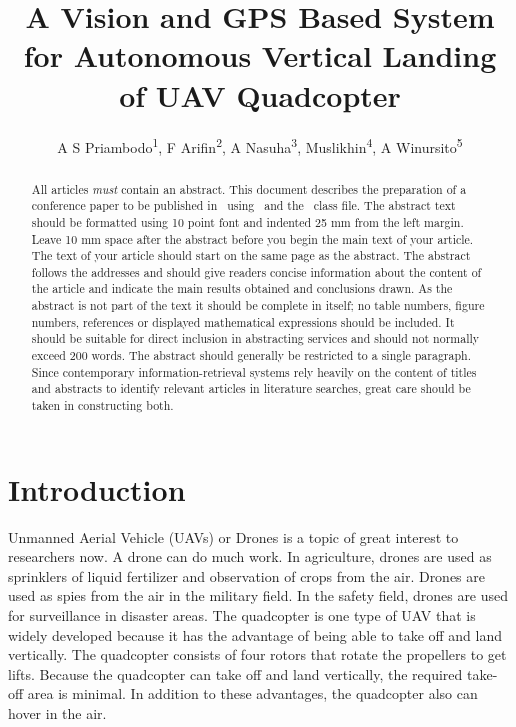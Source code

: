 \documentclass[a4paper]{jpconf}
\begin{document}
\title{A Vision and GPS Based System for Autonomous Vertical Landing of UAV Quadcopter}

\author{A S Priambodo\textsuperscript{1}, F Arifin\textsuperscript{2}, A Nasuha\textsuperscript{3}, Muslikhin\textsuperscript{4}, A Winursito\textsuperscript{5}}

\address{\textsuperscript{1,2,3,4,5}Department of Electronics and Informatics Engineering of Education, Engineering Faculty, Universitas Negeri Yogyakarta, Indonesia}


\begin{abstract}
    All articles {\it must} contain an abstract. This document describes the  preparation of a conference paper to be published in \jpcs\ using \LaTeXe\ and the \cls\ class file. The abstract text should be formatted using 10 point font and indented 25 mm from the left margin. Leave 10 mm space after the abstract before you begin the main text of your article. The text of your article should start on the same page as the abstract. The abstract follows the addresses and should give readers concise information about the content of the article and indicate the main results obtained and conclusions drawn. As the abstract is not part of the text it should be complete in itself; no table numbers, figure numbers, references or displayed mathematical expressions should be included. It should be suitable for direct inclusion in abstracting services and should not normally exceed 200 words. The abstract should generally be restricted to a single paragraph. Since contemporary information-retrieval systems rely heavily on the content of titles and abstracts to identify relevant articles in literature searches, great care should be taken in constructing both.
\end{abstract}

\section{Introduction}
Unmanned Aerial Vehicle (UAVs) or Drones is a topic of great interest to researchers now. A drone can do much work. In agriculture, drones are used as sprinklers of liquid fertilizer and observation of crops from the air. Drones are used as spies from the air in the military field. In the safety field, drones are used for surveillance in disaster areas. The quadcopter is one type of UAV that is widely developed because it has the advantage of being able to take off and land vertically. The quadcopter consists of four rotors that rotate the propellers to get lifts. Because the quadcopter can take off and land vertically, the required take-off area is minimal. In addition to these advantages, the quadcopter also can hover in the air.
\end{document}
